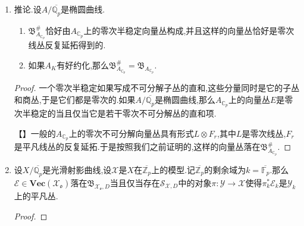 \begin{enumerate}
\begin{proof}
    	\qquad
    	
    	设$\mathcal{Z}'_{\kappa}$的不可约分支为$C_1,\cdots,C_r$,正规化记作$\widetilde{C_i}\to C_i$.记复合态射$\widetilde{C_i}\to C_i\to\mathcal{Z}'$为$\alpha_i$.由于$\mathcal{E}_2$是局部自由的,于是有$\widetilde{C_i}$上模层的正合列$0\to\alpha_i^*\mathscr{F}\to\alpha_i^*\mathcal{E}'\to\alpha_i^*\mathcal{E}_2\to0$.按照$\mathcal{E}'_{\kappa}$是平凡丛,有$\alpha_i^*\mathcal{E}'$同构于某个$\mathscr{O}_{\widetilde{C_i}}^n$.于是它是光滑射影曲线$\widetilde{C_i}/\kappa$上的零次半稳定向量丛.进而有$\alpha_i^*\mathcal{E}_2$的次数$\ge0$对任意$i$成立.按照【neron model 9.1.5】次数公式,得到$\deg(\det(\mathcal{E}_2)_{\kappa})=\chi(\mathcal{Z}_{\kappa})-\chi(\mathcal{Z}_{\kappa},\mathscr{O}_{\mathcal{Z}_{\kappa}})\ge0$.于是按照欧拉示性数在$\mathcal{Z}$的纤维上是局部常值的,就得到$\deg(E_2)=\deg((\mathcal{E}_2)_Q)\ge0$,得证.【$\kappa$是可分闭用在哪里了?】
    \end{proof}
    \item 推论.设$A/\overline{\mathbb{Q}_p}$是椭圆曲线.
    \begin{enumerate}[(1)]
    	\item $\mathfrak{B}^{\#}_{A_{\mathbb{C}_p}}$恰好由$A_{\mathbb{C}_p}$上的零次半稳定向量丛构成,并且这样的向量丛恰好是零次线丛反复延拓得到的.
    	\item 如果$A_K$有好约化,那么$\mathfrak{B}^{\#}_{A_{\mathbb{C}_p}}=\mathfrak{B}_{A_{\mathbb{C}_p}}$.
    \end{enumerate}
    \begin{proof}
    	
    	一个零次半稳定如果写成不可分解子丛的直和,这些分量同时是它的子丛和商丛,于是它们都是零次的.如果$A/\overline{\mathbb{Q}_p}$是椭圆曲线,那么$A_{\mathbb{C}_p}$上的向量丛$E$是零次半稳定的当且仅当它是若干零次不可分解丛的直和项.
    	
    	\qquad
    	
    	【】一般的$A_{\mathbb{C}_p}$上的零次不可分解向量丛具有形式$L\otimes F_r$,其中$L$是零次线丛,$F_r$是平凡线丛的反复延拓.于是按照我们之前证明的,这样的向量丛落在$\mathfrak{B}_{A_{\mathbb{C}_p}}^{\#}$.
    	
    \end{proof}
    \item 设$X/\overline{\mathbb{Q}_p}$是光滑射影曲线,设$\mathcal{X}$是$X$在$\overline{\mathbb{Z}_p}$上的模型.记$\overline{\mathbb{Z}_p}$的剩余域为$k=\overline{\mathbb{F}_p}$.那么$\mathcal{E}\in\textbf{Vec}(\mathcal{X}_{\mathfrak{o}})$落在$\mathfrak{B}_{\mathcal{X}_{\mathfrak{o}},D}$当且仅当存在$\mathcal{S}_{\mathcal{X},D}$中的对象$\pi:\mathcal{Y}\to\mathcal{X}$使得$\pi_k^*\mathcal{E}_k$是$\mathcal{Y}_k$上的平凡丛.
    \begin{proof}
    	

\end{proof}
\end{enumerate}
